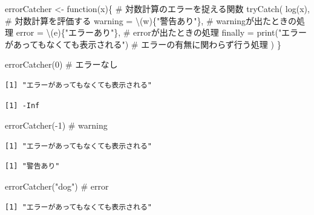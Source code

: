\documentclass[
  letterpaper,
  DIV=11,
  numbers=noendperiod]{scrreprt}
\newenvironment{Shaded}{\begin{snugshade}}{\end{snugshade}}
\newcommand{\AttributeTok}[1]{\textcolor[rgb]{0.40,0.45,0.13}{#1}}
\newcommand{\CommentTok}[1]{\textcolor[rgb]{0.37,0.37,0.37}{#1}}
\newcommand{\ControlFlowTok}[1]{\textcolor[rgb]{0.00,0.23,0.31}{#1}}
\newcommand{\DecValTok}[1]{\textcolor[rgb]{0.68,0.00,0.00}{#1}}
\newcommand{\FunctionTok}[1]{\textcolor[rgb]{0.28,0.35,0.67}{#1}}
\newcommand{\NormalTok}[1]{\textcolor[rgb]{0.00,0.23,0.31}{#1}}
\newcommand{\OtherTok}[1]{\textcolor[rgb]{0.00,0.23,0.31}{#1}}
\newcommand{\SpecialCharTok}[1]{\textcolor[rgb]{0.37,0.37,0.37}{#1}}
\newcommand{\StringTok}[1]{\textcolor[rgb]{0.13,0.47,0.30}{#1}}
\begin{document}
\begin{Shaded}
\begin{Highlighting}[]
\NormalTok{errorCatcher }\OtherTok{\textless{}{-}} \ControlFlowTok{function}\NormalTok{(x)\{ }\CommentTok{\# 対数計算のエラーを捉える関数}
  \FunctionTok{tryCatch}\NormalTok{(}
    \FunctionTok{log}\NormalTok{(x), }\CommentTok{\# 対数計算を評価する}
    \AttributeTok{warning =}\NormalTok{ \textbackslash{}(w)\{}\StringTok{"警告あり"}\NormalTok{\}, }\CommentTok{\# warningが出たときの処理}
    \AttributeTok{error =}\NormalTok{ \textbackslash{}(e)\{}\StringTok{"エラーあり"}\NormalTok{\}, }\CommentTok{\# errorが出たときの処理}
    \AttributeTok{finally =} \FunctionTok{print}\NormalTok{(}\StringTok{"エラーがあってもなくても表示される"}\NormalTok{) }\CommentTok{\# エラーの有無に関わらず行う処理}
\NormalTok{  )}
\NormalTok{\}}

\FunctionTok{errorCatcher}\NormalTok{(}\DecValTok{0}\NormalTok{) }\CommentTok{\# エラーなし}
\end{Highlighting}
\end{Shaded}

\begin{verbatim}
[1] "エラーがあってもなくても表示される"
\end{verbatim}

\begin{verbatim}
[1] -Inf
\end{verbatim}

\begin{Shaded}
\begin{Highlighting}[]
\FunctionTok{errorCatcher}\NormalTok{(}\SpecialCharTok{{-}}\DecValTok{1}\NormalTok{) }\CommentTok{\# warning}
\end{Highlighting}
\end{Shaded}

\begin{verbatim}
[1] "エラーがあってもなくても表示される"
\end{verbatim}

\begin{verbatim}
[1] "警告あり"
\end{verbatim}

\begin{Shaded}
\begin{Highlighting}[]
\FunctionTok{errorCatcher}\NormalTok{(}\StringTok{"dog"}\NormalTok{) }\CommentTok{\# error}
\end{Highlighting}
\end{Shaded}

\begin{verbatim}
[1] "エラーがあってもなくても表示される"
\end{verbatim}
\end{document}
